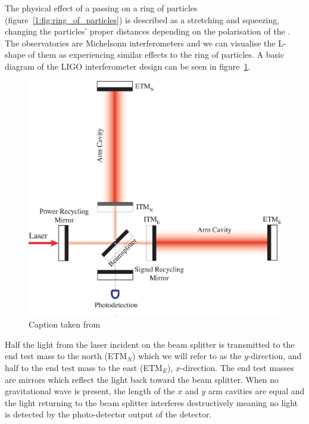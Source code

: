 The physical effect of a passing \gw on a ring of particles (figure~\ref{1:fig:ring_of_particles}) is described as a stretching and squeezing, changing the particles' proper distances depending on the polarisation of the \gw. The \gwadj observatories are Michelsonn interferometers and we can visualise the L-shape of them as experiencing similar effects to the ring of particles. A basic diagram of the LIGO interferometer design can be seen in figure~\ref{1:fig:ifo}.
%
\begin{figure}
    \centering
    \includegraphics[width=1.0\linewidth]{images/1_general_relativity/gravitational_wave_detection/IFO.eps}
    \caption{Caption taken from~\cite{IFO_diagram:2008}}
    \label{1:fig:ifo}
\end{figure}
%

Half the light from the laser incident on the beam splitter is transmitted to the end test mass to the north (ETM$_{N}$) which we will refer to as the $y$-direction, and half to the end test mass to the east (ETM$_{E}$), $x$-direction. The end test masses are mirrors which reflect the light back toward the beam splitter. When no gravitational wave is present, the length of the $x$ and $y$ arm cavities are equal and the light returning to the beam splitter interferes destructively meaning no light is detected by the photo-detector output of the detector.


